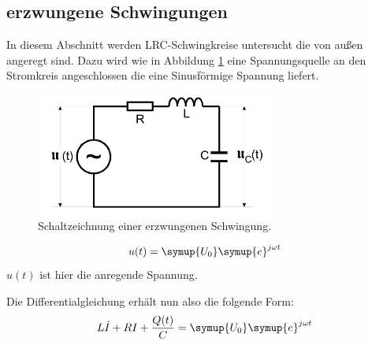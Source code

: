 


    \subsection{erzwungene Schwingungen}
    

    \noindent In diesem Abschnitt werden LRC-Schwingkreise untersucht die von außen angeregt sind. Dazu wird wie in Abbildung \ref{img:erz} 
    eine Spannungsquelle an den Stromkreis angeschlossen die eine Sinusförmige Spannung liefert.
    
    \begin{figure}[H]
        \centering
        \includegraphics[width=0.7\textwidth]{images/Erzwungene.PNG}
        \caption{Schaltzeichnung einer erzwungenen Schwingung.}
        \label{img:erz}
    \end{figure}

    \begin{equation}
        u(t)= \symup{U_0} \symup{e}^{j \omega t} \nonumber
    \end{equation}
    $u(t)$ ist hier die anregende Spannung.

    \noindent Die Differentialgleichung erhält nun also die folgende Form:
    \begin{equation}
        L \dot{I} + R I + \frac{Q(t)}{C} = \symup{U_0} \symup{e}^{j \omega t} \nonumber
    \end{equation}

